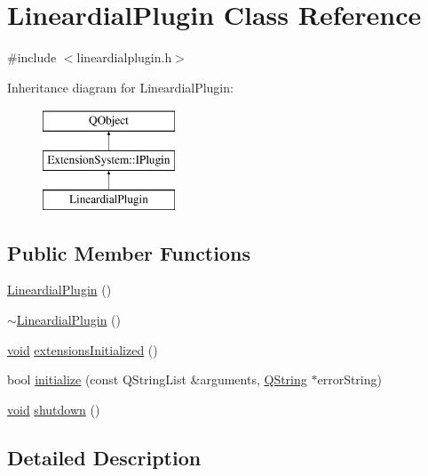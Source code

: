 \hypertarget{class_lineardial_plugin}{\section{Lineardial\-Plugin Class Reference}
\label{class_lineardial_plugin}
}


{\ttfamily \#include $<$lineardialplugin.\-h$>$}

Inheritance diagram for Lineardial\-Plugin\-:\begin{figure}[H]
\begin{center}
\leavevmode
\includegraphics[height=3.000000cm]{class_lineardial_plugin}
\end{center}
\end{figure}
\subsection*{Public Member Functions}
\begin{DoxyCompactItemize}
\item 
\hyperlink{group___linear_dial_plugin_gaeea9f7a365f52b1aef0da13809fabbc6}{Lineardial\-Plugin} ()
\item 
\hyperlink{group___linear_dial_plugin_ga945fcb418fce051d1998af913f4b6c6f}{$\sim$\-Lineardial\-Plugin} ()
\item 
\hyperlink{group___u_a_v_objects_plugin_ga444cf2ff3f0ecbe028adce838d373f5c}{void} \hyperlink{group___linear_dial_plugin_ga383081754a198481bde0fce79b7c01a9}{extensions\-Initialized} ()
\item 
bool \hyperlink{group___linear_dial_plugin_gab9c622169ddf91a97d6bd560b4f24f6f}{initialize} (const Q\-String\-List \&arguments, \hyperlink{group___u_a_v_objects_plugin_gab9d252f49c333c94a72f97ce3105a32d}{Q\-String} $\ast$error\-String)
\item 
\hyperlink{group___u_a_v_objects_plugin_ga444cf2ff3f0ecbe028adce838d373f5c}{void} \hyperlink{group___linear_dial_plugin_ga7a47ee89aef6192202148d71bf6a98a3}{shutdown} ()
\end{DoxyCompactItemize}


\subsection{Detailed Description}


